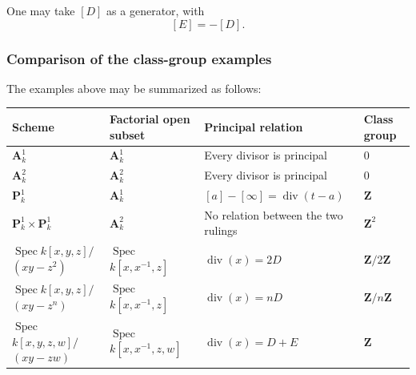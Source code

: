 One may take \([D]\) as a generator, with
\[
[E]=-[D].
\]

\subsubsection{Comparison of the class-group examples}

The examples above may be summarized as follows:

\begin{center}
\begingroup
\setlength{\tabcolsep}{3pt}
\renewcommand{\arraystretch}{1.25}
\begin{tabular}{|p{3.5cm}|p{3.7cm}|p{4.3cm}|p{2.4cm}|}
	\hline
	\textbf{Scheme}
	&
	\textbf{Factorial open subset}
	&
	\textbf{Principal relation}
	&
	\textbf{Class group}
	\\
	\hline
	\(\mathbf A^1_k\)
	&
	\(\mathbf A^1_k\)
	&
	Every divisor is principal
	&
	\(0\)
	\\
	\hline
	\(\mathbf A^2_k\)
	&
	\(\mathbf A^2_k\)
	&
	Every divisor is principal
	&
	\(0\)
	\\
	\hline
	\(\mathbf P^1_k\)
	&
	\(\mathbf A^1_k\)
	&
	\([a]-[\infty]=\operatorname{div}(t-a)\)
	&
	\(\mathbf Z\)
	\\
	\hline
	\(\mathbf P^1_k\times\mathbf P^1_k\)
	&
	\(\mathbf A^2_k\)
	&
	No relation between the two rulings
	&
	\(\mathbf Z^2\)
	\\
	\hline
	\(\operatorname{Spec}\)\newline\(k[x,y,z]/\)\newline\((xy-z^2)\)
	&
	\(\operatorname{Spec}\)\newline\(k[x,x^{-1},z]\)
	&
	\(\operatorname{div}(x)=2D\)
	&
	\(\mathbf Z/2\mathbf Z\)
	\\
	\hline
	\(\operatorname{Spec}\)\newline\(k[x,y,z]/\)\newline\((xy-z^n)\)
	&
	\(\operatorname{Spec}\)\newline\(k[x,x^{-1},z]\)
	&
	\(\operatorname{div}(x)=nD\)
	&
	\(\mathbf Z/n\mathbf Z\)
	\\
	\hline
	\(\operatorname{Spec}\)\newline\(k[x,y,z,w]/\)\newline\((xy-zw)\)
	&
	\(\operatorname{Spec}\)\newline\(k[x,x^{-1},z,w]\)
	&
	\(\operatorname{div}(x)=D+E\)
	&
	\(\mathbf Z\)
	\\
	\hline
\end{tabular}
\endgroup
\end{center}

